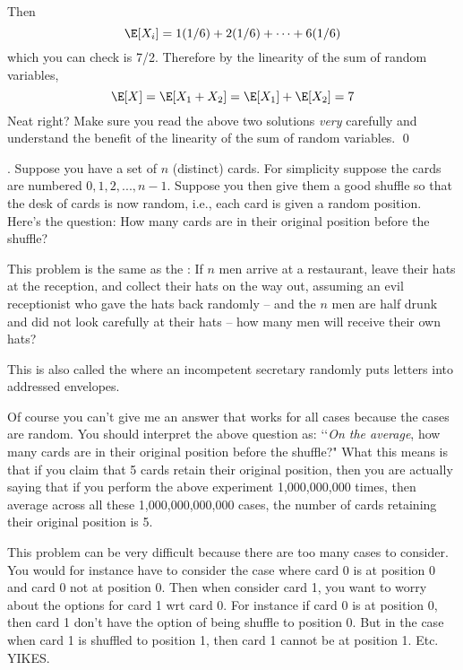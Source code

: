 Then
\[
  \E[X_i] = 1 (1/6) + 2 (1/6) + \cdots + 6 (1/6)
\]
which you can check is 7/2.
Therefore by the linearity of the sum of random variables,
\[
  \E[X] = \E[X_1 + X_2] = \E[X_1] + \E[X_2] = 7
\]
Neat right?
Make sure you read the above two solutions \textit{very}
carefully and understand the benefit of
the linearity of the sum of random variables.
\qed






\newpage

\begin{eg}
  .
  Suppose you have a set of $n$ (distinct) cards.
  For simplicity suppose the cards are numbered $0, 1, 2, ..., n - 1$.
  Suppose you then give them a good shuffle so that the desk of cards
  is now random, i.e., each card is  given a random position.
  Here's the question:
  How many cards are in their original position before the shuffle?
  
  This problem is the same as the :
  If $n$ men arrive at a restaurant, leave their hats at the
  reception, and collect their hats on the way out,
  assuming an evil receptionist who gave the hats back randomly
  -- and the $n$ men are half drunk and did not look carefully
  at their hats -- how many men will receive their own hats?

  This is also called the  where
  an incompetent secretary randomly puts letters into addressed envelopes.
\end{eg}

Of course you can't give me an answer that works for all cases
because the cases are random.
You should interpret the above question as:
\lq\lq \textit{On the average},
how many cards are in their original position before the shuffle?"
What this means is that if you claim that 5 cards retain their
original position, then you are actually saying that
if you perform the above experiment 1,000,000,000 times,
then average across all these 1,000,000,000,000 cases, the number of cards
retaining their original position is 5.

This problem can be
very difficult because there are too many cases to consider.
You would for instance have to consider the case where card 0 is at position 0
and card 0 not at position 0.
Then when consider card 1, you want to worry about the options for card 1
wrt card 0.
For instance if card 0 is at position 0, then card 1 don't have the option
of being shuffle to position 0.
But in the case when card 1 is shuffled to position 1, then card 1
cannot be at position 1.
Etc.
YIKES.

